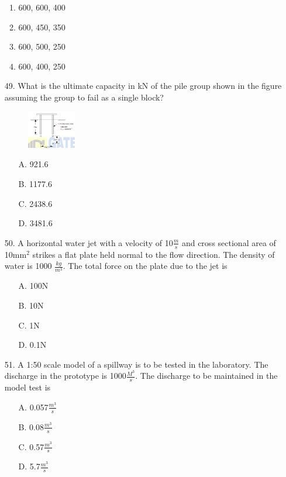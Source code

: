\documentclass[journal]{IEEEtran}
\begin{document}
\begin{enumerate}
  \begin{enumerate}[label=\Alph*]
      \item 600, 600, 400
      \item 600, 450, 350
      \item 600, 500, 250
      \item 600, 400, 250
  \end{enumerate}
  \item [49.] What is the ultimate capacity in kN of the pile group shown in the figure
  assuming the group to fail as a single block? 
  \begin{figure}[h!]
    \centering
    \includegraphics[width=0.2\textwidth]{figs/Fig_7.png}  %
    \label{fig:sample7}
\end{figure}
  \begin{enumerate}
    \item [A.] 921.6
    \item [B.] 1177.6
    \item [C.] 2438.6
    \item [D.] 3481.6
  \end{enumerate}
  \item [50.] A horizontal water jet with a velocity of 10$\frac{m}{s}$ and cross sectional area of 10mm$^2$
  strikes a flat plate held normal to the flow direction. The density of water is 1000
  $\frac{kg}{m^3}$. The total force on the plate due to the jet is 
  \begin{enumerate}
    \item [A.] 100N
    \item [B.] 10N 
    \item [C.] 1N 
    \item [D.] 0.1N 
  \end{enumerate}
  \item [51.] A 1:50 scale model of a spillway is to be tested in the laboratory. The discharge in
  the prototype is 1000$\frac{M^3}{s}$. The discharge to be maintained in the model test is 
  \begin{enumerate}
    \item [A.] 0.057$\frac{m^3}{s}$ 
    \item [B.] 0.08$\frac{m^3}{s}$
    \item [C.] 0.57$\frac{m^3}{s}$ 
    \item [D.] 5.7$\frac{m^3}{s}$
  \end{enumerate}
\end{enumerate}
\end{document}

